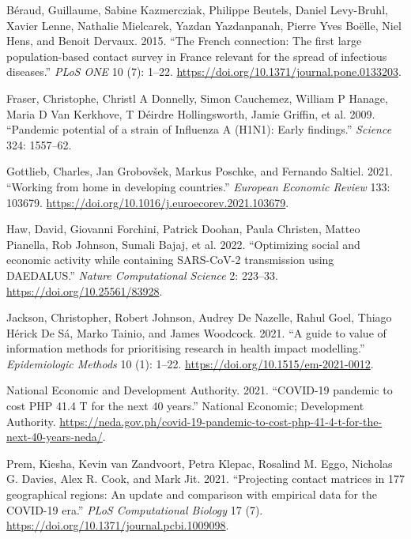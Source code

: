 \documentclass[
]{article}
\newlength{\cslhangindent}
\newlength{\cslentryspacingunit} %
\newenvironment{CSLReferences}[2] %
 {%
  \setlength{\parindent}{0pt}
  \ifodd #1
  \let\oldpar\par
  \def\par{\hangindent=\cslhangindent\oldpar}
  \fi
  \setlength{\parskip}{#2\cslentryspacingunit}
 }%
 {}
\begin{document}
\hypertarget{refs}{}
\begin{CSLReferences}{1}{0}
\leavevmode{}%
Béraud, Guillaume, Sabine Kazmercziak, Philippe Beutels, Daniel Levy-Bruhl, Xavier Lenne, Nathalie Mielcarek, Yazdan Yazdanpanah, Pierre Yves Boëlle, Niel Hens, and Benoit Dervaux. 2015. {``{The French connection: The first large population-based contact survey in France relevant for the spread of infectious diseases}.''} \emph{PLoS ONE} 10 (7): 1--22. \url{https://doi.org/10.1371/journal.pone.0133203}.

\leavevmode{}%
Fraser, Christophe, Christl A Donnelly, Simon Cauchemez, William P Hanage, Maria D Van Kerkhove, T Déirdre Hollingsworth, Jamie Griffin, et al. 2009. {``{Pandemic potential of a strain of Influenza A (H1N1): Early findings}.''} \emph{Science} 324: 1557--62.

\leavevmode{}%
Gottlieb, Charles, Jan Grobovšek, Markus Poschke, and Fernando Saltiel. 2021. {``{Working from home in developing countries}.''} \emph{European Economic Review} 133: 103679. \url{https://doi.org/10.1016/j.euroecorev.2021.103679}.

\leavevmode{}%
Haw, David, Giovanni Forchini, Patrick Doohan, Paula Christen, Matteo Pianella, Rob Johnson, Sumali Bajaj, et al. 2022. {``{Optimizing social and economic activity while containing SARS-CoV-2 transmission using DAEDALUS}.''} \emph{Nature Computational Science} 2: 223--33. \url{https://doi.org/10.25561/83928}.

\leavevmode{}%
Jackson, Christopher, Robert Johnson, Audrey De Nazelle, Rahul Goel, Thiago Hérick De Sá, Marko Tainio, and James Woodcock. 2021. {``{A guide to value of information methods for prioritising research in health impact modelling}.''} \emph{Epidemiologic Methods} 10 (1): 1--22. \url{https://doi.org/10.1515/em-2021-0012}.

\leavevmode{}%
National Economic and Development Authority. 2021. {``{COVID-19 pandemic to cost PHP 41.4 T for the next 40 years}.''} National Economic; Development Authority. \url{https://neda.gov.ph/covid-19-pandemic-to-cost-php-41-4-t-for-the-next-40-years-neda/}.

\leavevmode{}%
Prem, Kiesha, Kevin van Zandvoort, Petra Klepac, Rosalind M. Eggo, Nicholas G. Davies, Alex R. Cook, and Mark Jit. 2021. {``{Projecting contact matrices in 177 geographical regions: An update and comparison with empirical data for the COVID-19 era}.''} \emph{PLoS Computational Biology} 17 (7). \url{https://doi.org/10.1371/journal.pcbi.1009098}.


\end{CSLReferences}
\end{document}
